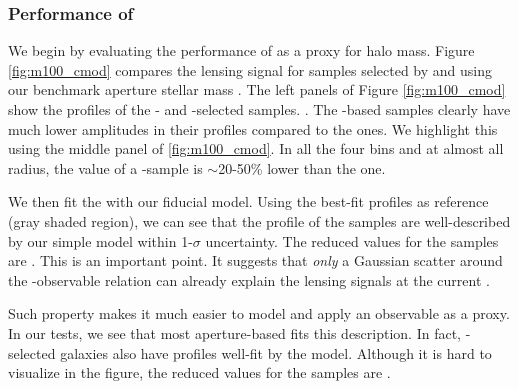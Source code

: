 \documentclass[a4paper,fleqn,usenatbib]{mnras}
\begin{document}
\subsubsection{Performance of \mcmodel{}}
    \label{sec:cmodel}


We begin by evaluating the performance of \cmodel{} as a proxy for halo mass. Figure \ref{fig:m100_cmod} compares the lensing signal for samples selected by \mcmodel{} and using our  benchmark aperture stellar mass . The left panels of  Figure \ref{fig:m100_cmod} show the \rdsigma{} profiles
            of the \mcmodel{}- and -selected samples. . The \mcmodel{}-based samples clearly have
            much lower amplitudes in their \dsigma{} profiles compared to the  ones.
            We highlight this using the middle panel of \ref{fig:m100_cmod}.            
            In all the four bins and at almost all radius, the \dsigma{} value of a \mcmodel{}-sample
            is $\sim$20-50\% lower than the  one.
            
            We then fit the \dsigma{} with our fiducial model.  Using the best-fit profiles as reference (gray shaded region), we can see that the
            \dsigma{} profile of the  samples are well-described by our simple model
            within 1-$\sigma$ uncertainty. The reduced \chisq{} values for the \maper{} samples are \todo{[XX, XX, XX, XX]}.
            This is an important point. It suggests that \emph{only} a Gaussian scatter around
            the \mvir{}-observable relation can already explain the lensing signals at
            the current \snratio{}.
            
            Such property makes it much easier to model and apply an observable as a \mvir{} proxy.
            In our tests, we see that most aperture-based \mstar{} fits this description.
            In fact, \cmodel{}-selected galaxies also have \dsigma{} profiles well-fit by the model.
            Although it is hard to visualize in the figure, the reduced \chisq{} values for the
            \mcmodel{} samples are \todo{[XX, XX, XX, XX]}.
\end{document}
